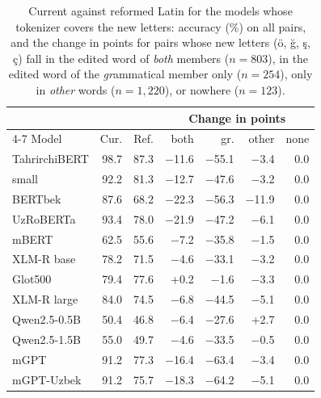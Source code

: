 \begin{table}[t]
\centering\small
\setlength{\tabcolsep}{3.2pt}
\begin{tabular}{@{}lrrrrrr@{}}
\toprule
 & & & \multicolumn{4}{c}{Change in points} \\
\cmidrule(l){4-7}
Model & Cur. & Ref. & both & gr. & other & none \\
\midrule
TahrirchiBERT & 98.7 & 87.3 & $-$11.6 & $-$55.1 & $-$3.4 & 0.0 \\
\quad small & 92.2 & 81.3 & $-$12.7 & $-$47.6 & $-$3.2 & 0.0 \\
BERTbek & 87.6 & 68.2 & $-$22.3 & $-$56.3 & $-$11.9 & 0.0 \\
UzRoBERTa & 93.4 & 78.0 & $-$21.9 & $-$47.2 & $-$6.1 & 0.0 \\
mBERT & 62.5 & 55.6 & $-$7.2 & $-$35.8 & $-$1.5 & 0.0 \\
XLM-R base & 78.2 & 71.5 & $-$4.6 & $-$33.1 & $-$3.2 & 0.0 \\
Glot500 & 79.4 & 77.6 & +0.2 & $-$1.6 & $-$3.3 & 0.0 \\
XLM-R large & 84.0 & 74.5 & $-$6.8 & $-$44.5 & $-$5.1 & 0.0 \\
Qwen2.5-0.5B & 50.4 & 46.8 & $-$6.4 & $-$27.6 & +2.7 & 0.0 \\
Qwen2.5-1.5B & 55.0 & 49.7 & $-$4.6 & $-$33.5 & $-$0.5 & 0.0 \\
mGPT & 91.2 & 77.3 & $-$16.4 & $-$63.4 & $-$3.4 & 0.0 \\
mGPT-Uzbek & 91.2 & 75.7 & $-$18.3 & $-$64.2 & $-$5.1 & 0.0 \\
\bottomrule
\end{tabular}
\caption{Current against reformed Latin for the models whose tokenizer covers the new letters: accuracy (\%) on all pairs, and the change in points for pairs whose new letters (\"o, \u{g}, \c{s}, \c{c}) fall in the edited word of \emph{both} members ($n=803$), in the edited word of the \emph{gr}ammatical member only ($n=254$), only in \emph{other} words ($n=1{,}220$), or nowhere ($n=123$).}
\label{tab:reform}
\end{table}
